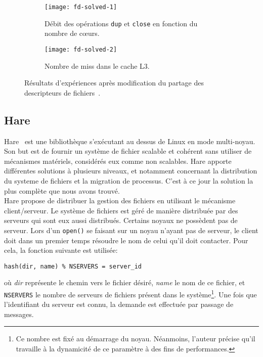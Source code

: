       \begin{figure}[ht]
        \begin{subfigure}[b]{0.5\textwidth}
          \texttt{[image: fd-solved-1]}
          \caption{Débit des opérations \texttt{dup} et \texttt{close} en
            fonction du nombre de c\oe urs.}
          \label{fig:fd-solved-1}
        \end{subfigure}
        \begin{subfigure}[b]{0.5\textwidth}
          \texttt{[image: fd-solved-2]}
          \caption{Nombre de miss dans le cache L3.}
          \label{fig:fd-solved-2}
        \end{subfigure}
        \caption{Résultats d'expériences après modification du partage des
          descripteurs de fichiers~\citep{boyd2008corey}.}
      \end{figure}
      \FloatBarrier


    \subsection{Hare}

      Hare~\citep{gruenwald2014providing} est une bibliothèque s'exécutant au
      dessus de Linux en mode multi-noyau. Son but est de fournir un système de
      fichier scalable et cohérent sans utiliser de mécanismes matériels,
      considérés eux comme non scalables. Hare apporte différentes solutions à
      plusieurs niveaux, et notamment concernant la distribution du systeme de
      fichiers et la migration de processus. C'est à ce jour la solution la plus
      complète que nous avons trouvé.\\

      Hare propose de distribuer la gestion des fichiers en utilisant le
      mécanisme client/serveur. Le système de fichiers est géré de manière
      distribuée par des serveurs qui sont eux aussi distribués. Certains noyaux
      ne possèdent pas de serveur. Lors d'un \texttt{open()} se faisant sur un
      noyau n'ayant pas de serveur, le client doit dans un premier temps
      résoudre le nom de celui qu'il doit contacter. Pour cela, la fonction
      suivante est utilisée:
      \begin{center}
        \texttt{hash(dir, name) \% NSERVERS = server\_id}
      \end{center}
      où \textit{dir} représente le chemin vers le fichier désiré, \textit{name}
      le nom de ce fichier, et \texttt{NSERVERS} le nombre de serveurs de
      fichiers présent dans le système\footnote{Ce nombre est fixé au démarrage
        du noyau. Néanmoins, l'auteur précise qu'il travaille à la dynamicité de
        ce paramètre à des fins de performances.}. Une fois que l'identifiant du
      serveur est connu, la demande est effectuée par passage de messages.

